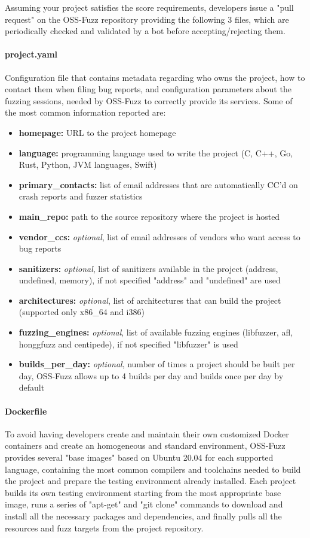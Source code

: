 \newpage
Assuming your project satisfies the score requirements, developers issue a "pull request" on the OSS-Fuzz repository providing the following 3 files, which are periodically checked and validated by a bot before accepting/rejecting them.

\paragraph{project.yaml} Configuration file that contains metadata regarding who owns the project, how to contact them when filing bug reports, and configuration parameters about the fuzzing sessions, needed by OSS-Fuzz to correctly provide its services.
Some of the most common information reported are:
\begin{itemize}
    \item \textbf{homepage:} URL to the project homepage
    \item \textbf{language:} programming language used to write the project (C, C++, Go, Rust, Python, JVM languages, Swift)
    \item \textbf{primary\_contacts:} list of email addresses that are automatically CC'd on crash reports and fuzzer statistics
    \item \textbf{main\_repo:} path to the source repository where the project is hosted
    \item \textbf{vendor\_ccs:} \textit{optional}, list of email addresses of vendors who want access to bug reports
    \item \textbf{sanitizers:} \textit{optional}, list of sanitizers available in the project (address, undefined, memory), if not specified "address" and "undefined" are used
    \item \textbf{architectures:} \textit{optional}, list of architectures that can build the project (supported only x86\_64 and i386)
    \item \textbf{fuzzing\_engines:} \textit{optional}, list of available fuzzing engines (libfuzzer, afl, honggfuzz and centipede), if not specified "libfuzzer" is used
    \item \textbf{builds\_per\_day:} \textit{optional}, number of times a project should be built per day, OSS-Fuzz allows up to 4 builds per day and builds once per day by default
\end{itemize}

\paragraph{Dockerfile} To avoid having developers create and maintain their own customized Docker containers and create an homogeneous and standard environment, OSS-Fuzz provides several "base images" based on Ubuntu 20.04 for each supported language, containing the most common compilers and toolchains needed to build the project and prepare the testing environment already installed. Each project builds its own testing environment starting from the most appropriate base image, runs a series of "apt-get" and "git clone" commands to download and install all the necessary packages and dependencies, and finally pulls all the resources and fuzz targets from the project repository.

